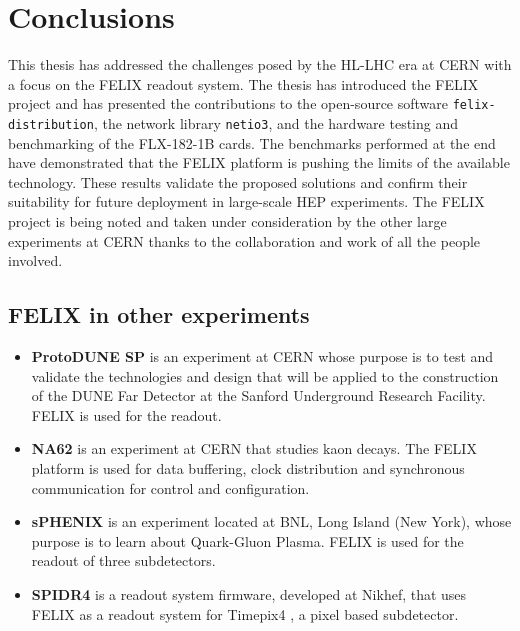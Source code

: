 \chapter{Conclusions}

This thesis has addressed the challenges posed by the \acl{HL-LHC} era at \acs{CERN} with a focus on the \acs{FELIX} readout system. The thesis has introduced the \acs{FELIX} project and has presented the contributions to the open-source software \texttt{felix-distribution}, the network library \texttt{netio3}, and the hardware testing and benchmarking of the FLX-182-1B cards. The benchmarks performed at the end have demonstrated that the \acs{FELIX} platform is pushing the limits of the available technology. These results validate the proposed solutions and confirm their suitability for future deployment in large-scale \acs{HEP} experiments. The \acs{FELIX} project is being noted and taken under consideration by the other large experiments at \acs{CERN} thanks to the collaboration and work of all the people involved.

\section{\acs{FELIX} in other experiments}
\begin{itemize}
    \item \textbf{ProtoDUNE SP} \cite{protodune} is an experiment at \acs{CERN} whose purpose is to test and validate the technologies and design that will be applied to the construction of the \acs{DUNE} Far Detector at the Sanford Underground Research Facility. \acs{FELIX} is used for the readout.

    \item \textbf{NA62} \cite{protodune, Martellotti:2056863} is an experiment at \acs{CERN} that studies kaon decays. The \acs{FELIX} platform is used for data buffering, clock distribution and synchronous communication for control and configuration.

    \item \textbf{sPHENIX} \cite{sphenix} is an experiment located at \acl{BNL}, Long Island (New York), whose purpose is to learn about Quark-Gluon Plasma. \acs{FELIX} is used for the readout of three subdetectors.

    \item \textbf{SPIDR4} \cite{spidr4} is a readout system firmware, developed at Nikhef, that uses \acs{FELIX} as a readout system for Timepix4 \cite{timepix4}, a pixel based subdetector. 
\end{itemize}

